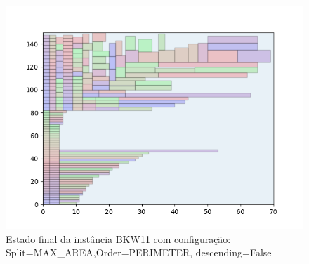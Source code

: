 \begin{figure}[H]
    \centering
    \caption[]{Estado final da instância BKW11 com configuração: Split=MAX_AREA,Order=PERIMETER, descending=False}
    \label{fig:bkw11-max_area-perimeter-false}
    \includegraphics[scale=0.5]{output/figures/bkw/bkw11/max_area/perimeter/false/000}
\end{figure}